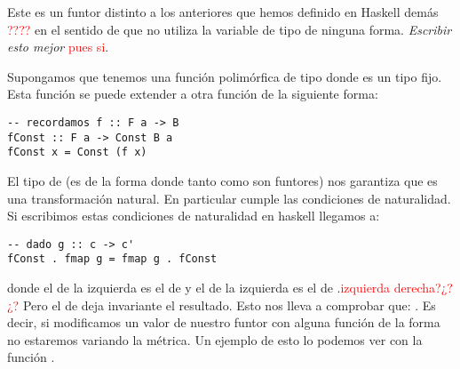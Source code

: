 Este es un funtor distinto a los anteriores que hemos
definido en Haskell demás \textcolor{red}{????} en el sentido de que no utiliza
la variable de tipo de ninguna forma. \textit{Escribir esto mejor} \textcolor{red}{pues si}.


Supongamos que tenemos una función polimórfica de tipo
 donde  es un tipo fijo. Esta función
se puede extender a otra función
 de la siguiente forma:
\begin{verbatim}
-- recordamos f :: F a -> B
fConst :: F a -> Const B a
fConst x = Const (f x)
\end{verbatim}
El tipo de  (es de la forma  donde tanto
 como  son funtores) nos garantiza que es una transformación
natural. En particular cumple las condiciones de naturalidad. Si
escribimos estas condiciones de naturalidad en haskell llegamos a:

\begin{verbatim}
-- dado g :: c -> c'
fConst . fmap g = fmap g . fConst
\end{verbatim}
donde el  de la izquierda es el de  y el de
la izquierda es el de .\textcolor{red}{izquierda derecha?¿?¿?} Pero el de 
deja invariante el resultado. Esto nos lleva a comprobar que:
. Es decir, si modificamos un valor de
nuestro funtor con alguna función de la forma  no
estaremos variando la métrica. Un ejemplo de esto lo podemos
ver con la función .

